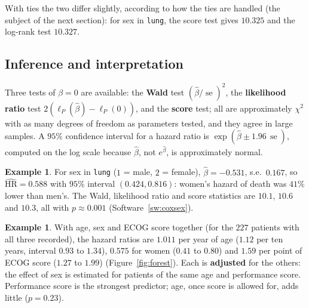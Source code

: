 \documentclass[11pt,a4paper]{article}
\numberwithin{equation}{section}
\theoremstyle{definition}
\newtheorem{exa}[thm]{Example}
\begin{document}
With ties the two differ slightly, according to how the ties are handled (the subject of the next section): for sex in \texttt{lung}, the score test gives $10.325$ and the log-rank test $10.327$.

\subsection{Inference and interpretation}
\label{ssec:coxinference}

Three tests of $\beta = 0$ are available: the \textbf{Wald} test $(\hat\beta/\operatorname{se})^2$, the \textbf{likelihood ratio} test $2(\ell_P(\hat\beta) - \ell_P(0))$, and the \textbf{score} test; all are approximately $\chi^2$ with as many degrees of freedom as parameters tested, and they agree in large samples. A $95\%$ confidence interval for a hazard ratio is
$\exp(\hat\beta \pm 1.96\,\operatorname{se})$, computed on the log scale because $\hat\beta$, not $e^{\hat\beta}$, is approximately normal.

\begin{exa}
\label{ex:coxsex}
For sex in \texttt{lung} ($1$ = male, $2$ = female), $\hat\beta = -0.531$, s.e.\ $0.167$, so $\widehat{\text{HR}} = 0.588$ with $95\%$ interval $(0.424, 0.816)$: women's hazard of death was $41\%$ lower than men's. The Wald, likelihood ratio and score statistics are $10.1$, $10.6$ and $10.3$, all with $p \approx 0.001$
(Software~\ref{sw:coxsex}).
\end{exa}

\begin{exa}
\label{ex:coxmulti}
With age, sex and ECOG score together (for the $227$ patients with all three recorded), the hazard ratios are $1.011$ per year of age ($1.12$ per ten years, interval $0.93$ to $1.34$), $0.575$ for women ($0.41$ to $0.80$) and $1.59$ per point of ECOG score ($1.27$ to $1.99$) (Figure~\ref{fig:forest}). Each is \textbf{adjusted} for the others: the
effect of sex is estimated for patients of the same age and performance score. Performance score is the strongest predictor; age, once score is allowed for, adds little ($p = 0.23$).
\end{exa}
\end{document}
